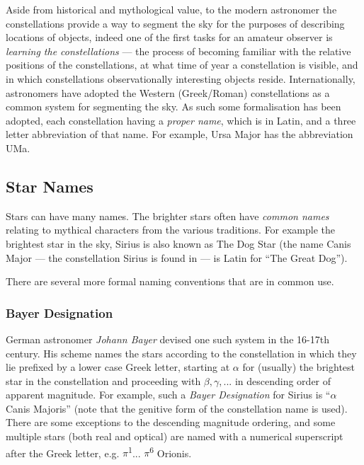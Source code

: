 Aside from historical and mythological value, to the modern astronomer
the constellations provide a way to segment the sky for the purposes of
describing locations of objects, indeed one of the first tasks for an
amateur observer is \emph{learning the constellations} --- the process
of becoming familiar with the relative positions of the constellations,
at what time of year a constellation is visible, and in which
constellations observationally interesting objects reside.
Internationally, astronomers have adopted the Western (Greek/Roman)
constellations as a common system for segmenting the sky. As such some
formalisation has been adopted, each constellation having a \emph{proper
name}, which is in Latin, and a three letter abbreviation of that name.
For example, Ursa Major has the abbreviation UMa.

\subsection{Star Names}\label{star-names}

Stars can have many names. The brighter stars often have \emph{common
names} relating to mythical characters from the various traditions. For
example the brightest star in the sky, Sirius is also known as The Dog
Star (the name Canis Major --- the constellation Sirius is found in ---
is Latin for ``The Great Dog'').

There are several more formal naming conventions that are in common use.

\subsubsection{Bayer Designation}
\label{sec:concept:Bayer}

German astronomer \emph{Johann Bayer} devised one such system in the
16-17th century. His scheme names the stars according to the
constellation in which they lie prefixed by a lower case Greek letter,
starting at $\alpha$ for (usually) the brightest star in the constellation and proceeding with $\beta, \gamma, ...$ in descending order of apparent magnitude. For example,
such a \emph{Bayer Designation} for Sirius is ``$\alpha$ Canis Majoris'' (note
that the genitive form of the constellation name is used). There are
some exceptions to the descending magnitude ordering, and some multiple
stars (both real and optical) are named with a numerical superscript
after the Greek letter, e.g. $\pi$\textsuperscript{1}...
$\pi$\textsuperscript{6} Orionis.


